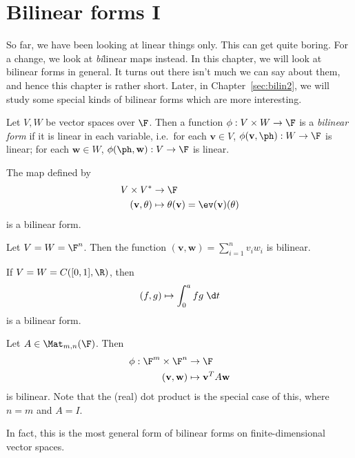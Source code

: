 \documentclass[a4paper]{article}
\begin{document}
\section{Bilinear forms I}
\label{sec:bilin1}
So far, we have been looking at linear things only. This can get quite boring. For a change, we look at \emph{bi}linear maps instead. In this chapter, we will look at bilinear forms in general. It turns out there isn't much we can say about them, and hence this chapter is rather short. Later, in Chapter~\ref{sec:bilin2}, we will study some special kinds of bilinear forms which are more interesting.

\begin{defi}
  Let $V, W$ be vector spaces over $\F$. Then a function $\phi: V\times W \to \F$ is a \emph{bilinear form} if it is linear in each variable, i.e.\ for each $\mathbf{v} \in V$, $\phi(\mathbf{v}, \ph): W \to \F$ is linear; for each $\mathbf{w} \in W$, $\phi(\ph, \mathbf{w}): V\to \F$ is linear.
\end{defi}

\begin{eg}
  The map defined by
  \begin{align*}
    V\times V^* &\to \F\\
    (\mathbf{v}, \theta) &\mapsto \theta(\mathbf{v}) = \ev(\mathbf{v})(\theta)
  \end{align*}
  is a bilinear form.
\end{eg}

\begin{eg}
  Let $V = W = \F^n$. Then the function $(\mathbf{v}, \mathbf{w}) = \sum_{i = 1}^n v_i w_i$ is bilinear.
\end{eg}

\begin{eg}
  If $V = W = C([0, 1], \R)$, then
  \[
    (f, g) \mapsto \int_0^a fg \;\d t
  \]
  is a bilinear form.
\end{eg}

\begin{eg}
  Let $A \in \Mat_{m, n}(\F)$. Then
  \begin{align*}
    \phi: \F^m \times \F^n &\to \F\\
       (\mathbf{v}, \mathbf{w}) &\mapsto \mathbf{v}^T A\mathbf{w}
  \end{align*}
  is bilinear. Note that the (real) dot product is the special case of this, where $n = m$ and $A = I$.
\end{eg}
In fact, this is the most general form of bilinear forms on finite-dimensional vector spaces.
\end{document}
